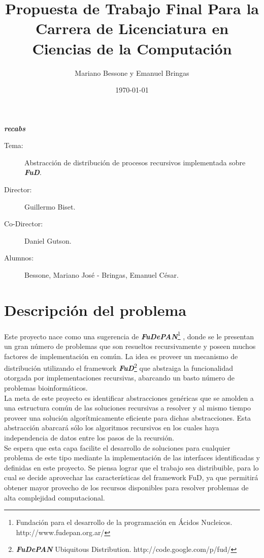 \documentclass[a4paper,12pt]{article}
\title{Propuesta de Trabajo Final Para la Carrera de Licenciatura en Ciencias de la Computación}
\author{Mariano Bessone y Emanuel Bringas}
\date{\today}
\def\rc {\textbf{\textit{recabs}}}
\def\fud {\textbf{\textit{FuD}}}
\def\fude {\textbf{\textit{FuDePAN}}}
\begin{document}
\maketitle

    \begin{center}
        \begin{large}
            \rc{}
        \end{large}
    \end{center}
    \begin{description}
    \item[Tema:] Abstracción de distribución de procesos recursivos implementada sobre \fud{}. %
    \item[Director:] Guillermo Biset.
    \item[Co-Director:] Daniel Gutson. 
    \item[Alumnos:] Bessone, Mariano José - Bringas, Emanuel César.
    \end{description}

    \section{Descripción del problema}

    Este proyecto nace como una sugerencia de \fude{}\footnote{Fundación para el desarrollo de la programación en Ácidos Nucleicos. http://www.fudepan.org.ar/ }
    , donde se le presentan un gran número de problemas que son resueltos recursivamente y poseen muchos factores de implementación
    en común. La idea es proveer un mecanismo de distribución utilizando el framework \fud{}\footnote{\fude{} Ubiquitous Distribution\cite{clus09}.
    http://code.google.com/p/fud/} que abstraiga la funcionalidad otorgada por implementaciones recursivas, abarcando un basto número
    de problemas bioinformáticos.\\

    La meta de este proyecto es identificar abstracciones genéricas que se amolden a una estructura común de las soluciones recursivas a
    resolver y al mismo tiempo proveer una solución algorítmicamente eficiente para dichas abstracciones. Esta abstracción abarcará sólo
    los algoritmos recursivos en los cuales haya independencia de datos entre los pasos de la recursión.\\

    Se espera que esta capa facilite el desarrollo de soluciones para cualquier problema de este tipo mediante la implementación de las 
    interfaces identificadas y definidas en este proyecto. Se piensa lograr que el trabajo sea distribuible, para lo 
    cual se decide aprovechar las características del framework FuD, ya que permitirá obtener mayor provecho de los recursos disponibles 
    para resolver problemas de alta complejidad computacional.\\
\end{document}

